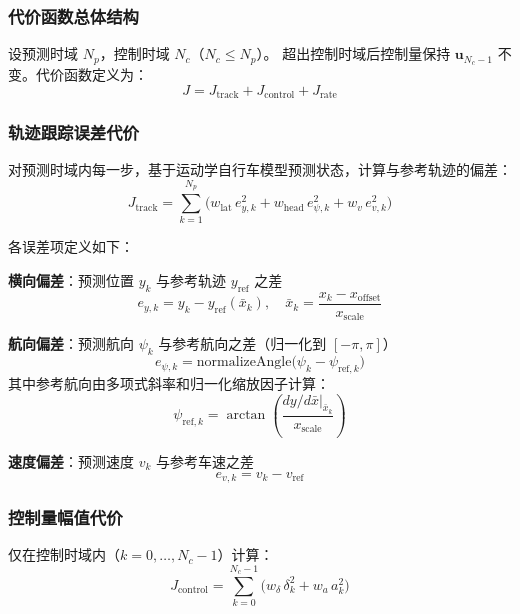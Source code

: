 \documentclass[a4paper,10pt]{article}
\begin{document}
\subsubsection{代价函数总体结构}

设预测时域 $N_p$，控制时域 $N_c$（$N_c \leq N_p$）。
超出控制时域后控制量保持 $\mathbf{u}_{N_c-1}$ 不变。代价函数定义为：
\begin{equation}
  J = J_{\text{track}} + J_{\text{control}} + J_{\text{rate}}
\end{equation}

\subsubsection{轨迹跟踪误差代价}

对预测时域内每一步，基于运动学自行车模型预测状态，计算与参考轨迹的偏差：
\begin{equation}
  J_{\text{track}} = \sum_{k=1}^{N_p} \Big( w_{\text{lat}} \, e_{y,k}^2 + w_{\text{head}} \, e_{\psi,k}^2 + w_{v} \, e_{v,k}^2 \Big)
\end{equation}

各误差项定义如下：

\textbf{横向偏差}：预测位置 $y_k$ 与参考轨迹 $y_{\text{ref}}$ 之差
\begin{equation}
  e_{y,k} = y_k - y_{\text{ref}}(\bar{x}_k), \quad \bar{x}_k = \frac{x_k - x_{\text{offset}}}{x_{\text{scale}}}
\end{equation}

\textbf{航向偏差}：预测航向 $\psi_k$ 与参考航向之差（归一化到 $[-\pi, \pi]$）
\begin{equation}
  e_{\psi,k} = \text{normalizeAngle}\!\Big(\psi_k - \psi_{\text{ref},k}\Big)
\end{equation}
其中参考航向由多项式斜率和归一化缩放因子计算：
\begin{equation}
  \psi_{\text{ref},k} = \arctan\!\left(\frac{dy/d\bar{x}\big|_{\bar{x}_k}}{x_{\text{scale}}}\right)
\end{equation}

\textbf{速度偏差}：预测速度 $v_k$ 与参考车速之差
\begin{equation}
  e_{v,k} = v_k - v_{\text{ref}}
\end{equation}

\subsubsection{控制量幅值代价}

仅在控制时域内（$k = 0, \ldots, N_c{-}1$）计算：
\begin{equation}
  J_{\text{control}} = \sum_{k=0}^{N_c-1} \Big( w_\delta \, \delta_k^2 + w_a \, a_k^2 \Big)
\end{equation}
\end{document}
